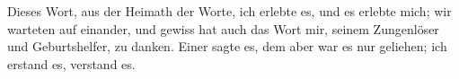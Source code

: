 Dieses Wort, aus der Heimath der Worte, ich erlebte es, und es erlebte mich; wir warteten auf einander, und gewiss hat auch das Wort mir, seinem Zungenlöser und Geburtshelfer, zu danken. Einer sagte es, dem aber war es nur geliehen; ich erstand es, verstand es.
\par

